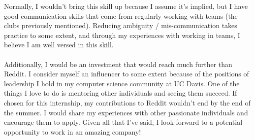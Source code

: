 \documentclass[11pt, a4paper]{awesome-cv}
\begin{document}
\begin{cvletter}
        Normally, I wouldn't bring this skill up because I assume it's implied, but I have good communication skills that come from regularly working with teams (the clubs previously mentioned).
        Reducing ambiguity / mis-communication takes practice to some extent, and through my experiences with working in teams, I believe I am well versed in this skill. \\ \\
        Additionally, I would be an investment that would reach much further than Reddit.
        I consider myself an influencer to some extent because of the positions of leadership I hold in my computer science community at UC Davis.
        One of the things I love to do is mentoring other individuals and seeing them succeed.
        If chosen for this internship, my contributions to Reddit wouldn't end by the end of the summer.
        I would share my experiences with other passionate individuals and encourage them to apply.
        Given all that I've said, I look forward to a potential opportunity to work in an amazing company!

    \end{cvletter}


    \makeletterclosing
\end{document}

